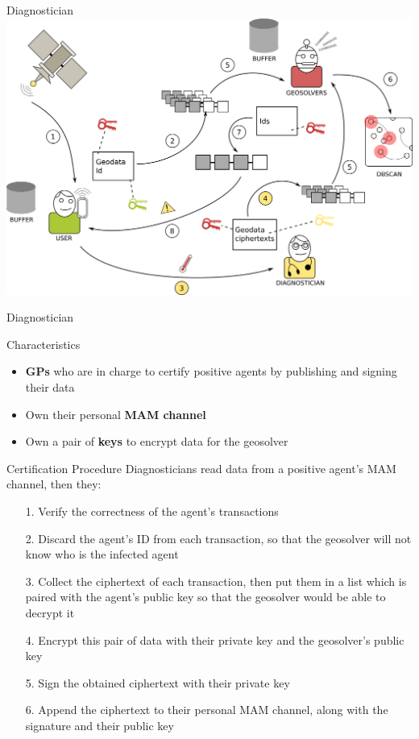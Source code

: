 \begin{frame}{Diagnostician}
    \centering
    \includegraphics[width=0.95\linewidth]{images/design_diagnosticians.png}
\end{frame}

\begin{frame}{Diagnostician}
    \begin{block}{Characteristics}
        \begin{itemize}
            \item \textbf{GPs} who are in charge to certify positive agents by publishing and signing their data
            \item Own their personal \textbf{MAM channel}
            \item Own a pair of \textbf{keys} to encrypt data for the geosolver
        \end{itemize}
    \end{block}
    
    \vspace{-3pt}
    
    \begin{block}{Certification Procedure}
        Diagnosticians read data from a positive agent's MAM channel, then they:
        \begin{itemize}
            \item [1.] Verify the correctness of the agent's transactions
            \item [2.] Discard the agent's ID from each transaction, so that the geosolver will not know who is the infected agent
            \item [3.] Collect the ciphertext of each transaction, then put them in a list which is paired with the agent's public key so that the geosolver would be able to decrypt it
            \item [4.] Encrypt this pair of data with their private key and the geosolver's public key
            \item [5.] Sign the obtained ciphertext with their private key
            \item [6.] Append the ciphertext to their personal MAM channel, along with the signature and their public key
        \end{itemize}
    \end{block}
\end{frame}